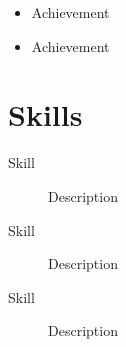 \documentclass[11pt,letterpaper]{article}
\begin{document}
\begin{itemize}
  \item Achievement
  \item Achievement
\end{itemize}

\lipsum[2][1-4]

\section{Skills} %

\begin{description}
  \item[Skill] Description
  \item[Skill] Description
  \item[Skill] Description
\end{description}
\end{document}
